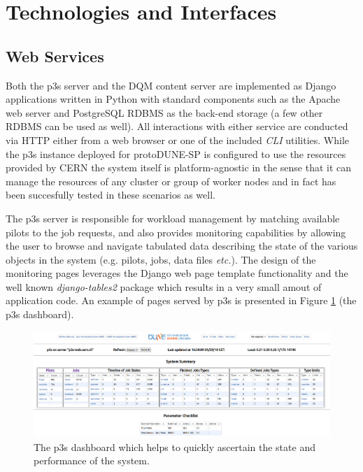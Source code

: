 \documentclass{webofc}
\newcommand{\pd}{protoDUNE\xspace}
\begin{document}
\section{Technologies and Interfaces}
\subsection{Web Services}

Both the p3s server and the DQM content server are implemented as Django
\cite{django} applications written in Python with standard components such
as the Apache web server and PostgreSQL RDBMS as the back-end storage
(a few other RDBMS can be used as well). All interactions with either service
are conducted via HTTP either from a web browser or one of the included \textit{CLI} utilities.
While the p3s instance deployed for \pd-SP is configured to use
the resources provided by CERN the system itself is platform-agnostic in the sense that
it can manage the resources of any cluster or group of worker nodes and in fact has
been succesfully tested in these scenarios as well.

The p3s server is responsible for workload management by matching available pilots to the job requests,
and also provides monitoring capabilities by allowing the user to browse and navigate
tabulated data describing the state of the various objects in the system (e.g. pilots, jobs, data files \textit{etc.}).
The design of the monitoring pages leverages the Django web page template functionality and
the well known \textit{django-tables2} package which results
in a very small amout of application code. An example of pages served by p3s is
presented in Figure \ref{fig:p3s_dash} (the p3s dashboard).

\begin{figure}[tb]
\centering\includegraphics[width=1.0\textwidth]{figures/p3s_dash_2018_v1.png}
\caption{\label{fig:p3s_dash}The p3s dashboard which helps to quickly ascertain
the state and performance of the system.}
\end{figure}
\end{document}
